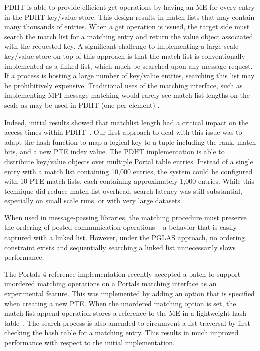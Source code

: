{} PDHT is able to provide efficient get
operations by having an ME for every entry in the PDHT key/value store. This
design results in match lists that may contain many thousands of entries. When
a get operation is issued, the target side must search the match list for a
matching entry and return the value object associated with the requested key. A
significant challenge to implementing a large-scale key/value store on top of
this approach is that the match list is conventionally implemented as a
linked-list, which much be searched upon any message request. If a process is
hosting a large number of key/value entries, searching this list may be
prohibitively expensive. Traditional uses of the matching interface, such as
implementing MPI message matching would rarely see match list lengths on the
scale as may be used in PDHT (one per element) \cite{flajslik:16}.

Indeed, initial results showed that matchlist length had a critical impact on
the access times within PDHT~\cite{comhpc16}. Our first approach to deal with
this issue was to adapt the hash function to map a logical key to a tuple
including the rank, match bits, and a new PTE index value. The PDHT
implementation is able to distribute key/value objects over multiple Portal
table entries. Instead of a single entry with a match list containing 10,000
entries, the system could be configured with 10 PTE match lists, each
containing approximately 1,000 entries. While this technique did reduce match
list overhead, search latency was still substantial, especially on small scale
runs, or with very large datasets.

When used in message-passing libraries, the matching procedure must preserve
the ordering of posted communication operations -- a behavior that is easily
captured with a linked list. However, under the PGLAS approach, no ordering
constraint exists and sequentially searching a linked list unnecessarily slows
performance.

The Portals 4 reference implementation recently accepted a patch to support
unordered matching operations on a Portals matching interface as an
experimental feature. This was implemented by adding an option that is
specified when creating a new PTE. When the unordered matching option is set,
the match list append operation stores a reference to the ME in a lightweight
hash table~\cite{uthash}.  The search process is also amended to circumvent a
list traversal by first checking the hash table for a matching entry. This
results in much improved performance with respect to the initial
implementation.\\

